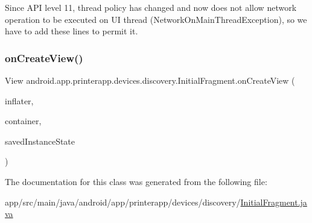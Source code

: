 Since A\+PI level 11, thread policy has changed and now does not allow network operation to be executed on UI thread (Network\+On\+Main\+Thread\+Exception), so we have to add these lines to permit it.\mbox{\label{classandroid_1_1app_1_1printerapp_1_1devices_1_1discovery_1_1_initial_fragment_ac84bedab28e9098fe08620d8f7fa9a14}} 
\subsubsection{\texorpdfstring{on\+Create\+View()}{onCreateView()}}
{\footnotesize\ttfamily View android.\+app.\+printerapp.\+devices.\+discovery.\+Initial\+Fragment.\+on\+Create\+View (\begin{DoxyParamCaption}\item[{Layout\+Inflater}]{inflater,  }\item[{View\+Group}]{container,  }\item[{Bundle}]{saved\+Instance\+State }\end{DoxyParamCaption})}



The documentation for this class was generated from the following file\+:\begin{DoxyCompactItemize}
\item 
app/src/main/java/android/app/printerapp/devices/discovery/\hyperlink{_initial_fragment_8java}{Initial\+Fragment.\+java}\end{DoxyCompactItemize}
